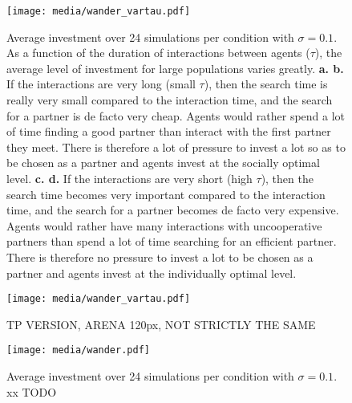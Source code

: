 \documentclass[letterpaper]{article}
\begin{document}
\begin{figure}[tbhp]
    \begin{center}
        \texttt{[image: media/wander\_vartau.pdf]}
        \vskip 0.25cm
        \caption{Average investment over 24 simulations per condition with $\sigma = 0.1$. As a function of the duration of interactions between agents ($\tau$), the average level of investment for large populations varies greatly. \textbf{a. b.} If the interactions are very long (small $\tau$), then the search time is really very small compared to the interaction time, and the search for a partner is de facto very cheap. Agents would rather spend a lot of time finding a good partner than interact with the first partner they meet. There is therefore a lot of pressure to invest a lot so as to be chosen as a partner and agents invest at the socially optimal level. \textbf{c. d.} If the interactions are very short (high $\tau$), then the search time becomes very important compared to the interaction time, and the search for a partner becomes de facto very expensive. Agents would rather have many interactions with uncooperative partners than spend a lot of time searching for an efficient partner. There is therefore no pressure to invest a lot to be chosen as a partner and agents invest at the individually optimal level.
        }
        \label{fig:vartau}
    \end{center}
\end{figure}

\begin{figure}[tbhp]
    \begin{center}
        \texttt{[image: media/wander\_vartau.pdf]}
        \vskip 0.25cm
        \caption{TP VERSION, ARENA 120px, NOT STRICTLY THE SAME
        }
        \label{fig:tp_vartau}
    \end{center}
\end{figure}


\begin{figure}[tbhp]
    \begin{center}
        \texttt{[image: media/wander.pdf]}
        \vskip 0.25cm
        \caption{Average investment over 24 simulations per condition with $\sigma = 0.1$. xx TODO
        }
        \label{fig:wander}
    \end{center}
\end{figure}
\end{document}
